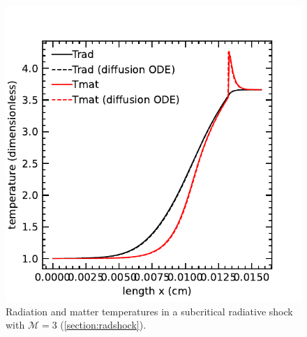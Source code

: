 \documentclass[fleqn,usenatbib]{mnras}
\begin{document}
\begin{figure}
    \includegraphics[width=\columnwidth]{radshock_cgs_temperature.pdf}
    \caption{Radiation and matter temperatures in a subcritical radiative shock with $\mathcal{M} = 3$ (\autoref{section:radshock}).}
    \label{fig:radshock}
\end{figure}
\end{document}
